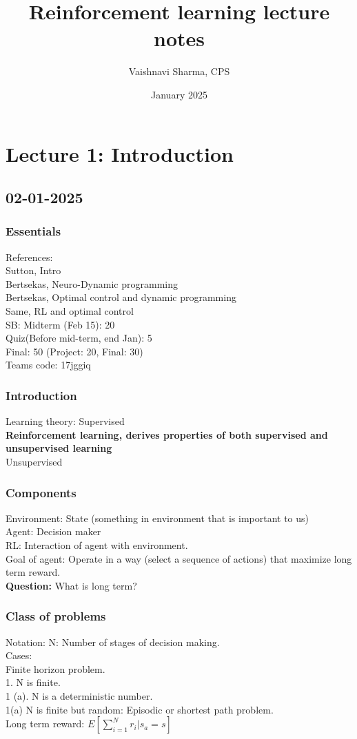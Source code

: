 \documentclass{book}
\title{Reinforcement learning lecture notes}
\author{Vaishnavi Sharma, CPS}
\date{January 2025}
\begin{document}
\maketitle
\chapter{Lecture 1: Introduction}
\section{02-01-2025}
\subsection{Essentials}
References: \\
Sutton, Intro\\
Bertsekas, Neuro-Dynamic programming\\
Bertsekas, Optimal control and dynamic programming\\
Same, RL and optimal control\\
SB: Midterm (Feb 15): 20\\
Quiz(Before mid-term, end Jan): 5\\
Final: 50 (Project: 20, Final: 30)\\
Teams code: 17jggiq

\subsection{Introduction}
Learning theory: Supervised\\
\textbf{Reinforcement learning, derives properties of both supervised and unsupervised learning}\\
Unsupervised\\

\subsection{Components}
Environment: State (something in environment that is important to us)\\
Agent: Decision maker\\
RL: Interaction of agent with environment. \\
Goal of agent: Operate in a way (select a sequence of actions) that maximize long term reward.\\
\textbf{Question:} What is long term?

\subsection{Class of problems}
Notation: N: Number of stages of decision making.\\
Cases:\\
Finite horizon problem.\\
1. N is finite.\\
1 (a). N is a deterministic number.\\
1(a) N is finite but random: Episodic or shortest path problem.\\
Long term reward: $E[\sum_{i = 1}^{N} r_{i}| s_{a} = s]$\\
\end{document}
